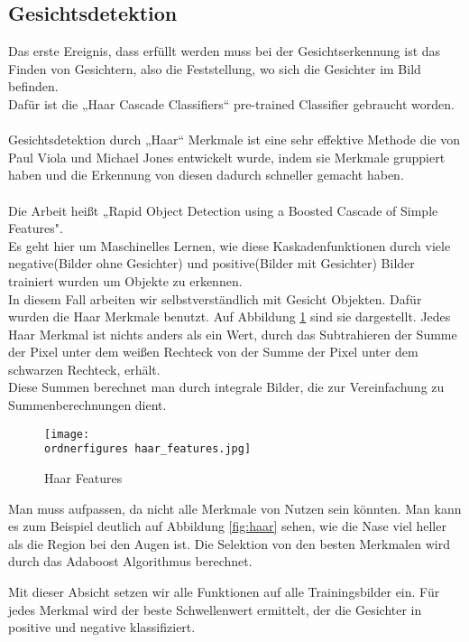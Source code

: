 \subsection{Gesichtsdetektion}

Das erste Ereignis, dass erfüllt werden muss bei der Gesichtserkennung ist das Finden von Gesichtern, also die Feststellung, wo sich die Gesichter im Bild befinden. \\ 
Dafür ist die „Haar Cascade Classifiers“  pre-trained Classifier gebraucht worden. \\ \\
Gesichtsdetektion durch „Haar“ Merkmale ist eine sehr effektive Methode die von Paul Viola und Michael Jones entwickelt wurde, indem sie Merkmale gruppiert haben und die Erkennung von diesen dadurch schneller gemacht haben. \\ \\
Die Arbeit heißt „Rapid Object Detection using a Boosted Cascade of Simple Features". \cite{Viola01robustreal-time}\\

Es geht hier um Maschinelles Lernen, wie diese Kaskadenfunktionen durch viele negative(Bilder ohne Gesichter) und positive(Bilder mit Gesichter) Bilder trainiert wurden um Objekte zu erkennen.\\ 
In diesem Fall  arbeiten wir selbstverständlich mit Gesicht Objekten. 
Dafür wurden die Haar Merkmale benutzt. Auf Abbildung \ref{fig:haar features} sind sie dargestellt. Jedes Haar Merkmal ist nichts anders als ein Wert, durch das Subtrahieren der Summe der Pixel unter dem weißen Rechteck von der Summe der Pixel unter dem schwarzen Rechteck, erhält. \\
Diese Summen berechnet man durch integrale Bilder, die zur Vereinfachung zu Summenberechnungen dient.

\begin{figure}
	\centering
	\texttt{[image: \\ordnerfigures haar\_features.jpg]}
	\caption{ Haar Features\cite{Viola01robustreal-time}}
	\label{fig:haar features}
\end{figure}

Man muss aufpassen, da nicht alle Merkmale von Nutzen sein könnten. Man kann es zum Beispiel deutlich auf Abbildung \ref*{fig:haar} sehen, wie die Nase viel heller als die Region bei den Augen ist. Die Selektion von den besten Merkmalen wird durch das Adaboost Algorithmus berechnet. 



Mit dieser Absicht setzen wir alle Funktionen auf alle Trainingsbilder ein. Für jedes Merkmal wird der beste Schwellenwert ermittelt, der die Gesichter in positive und negative klassifiziert.\\\\

